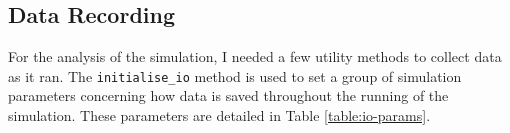 \documentclass[12pt,a4paper]{report}
\begin{document}



\subsection{Data Recording}

For the analysis of the simulation, I needed a few utility methods to collect data as it ran. The \texttt{initialise\_io} method is used to set a group of simulation parameters concerning how data is saved throughout the running of the simulation. These parameters are detailed in Table \ref{table:io-params}.
\end{document}
